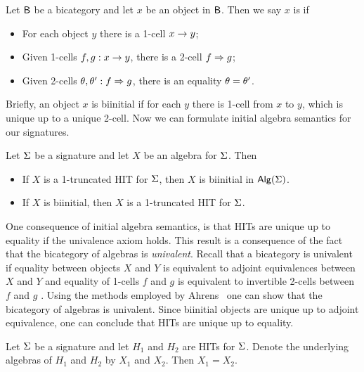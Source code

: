 \begin{definition}
Let $\mathsf{B}$ be a bicategory and let $x$ be an object in $\mathsf{B}$.
Then we say $x$ is  if
\begin{itemize}
	\item For each object $y$ there is a 1-cell $x \rightarrow y$;
	\item Given 1-cells $f, g : x \rightarrow y$, there is a 2-cell $f \Rightarrow g$;
	\item Given 2-cells $\theta, \theta' : f \Rightarrow g$, there is an equality $\theta = \theta'$.
\end{itemize}
\end{definition}

Briefly, an object $x$ is biinitial if for each $y$ there is 1-cell from $x$ to $y$, which is unique up to a unique 2-cell.
Now we can formulate initial algebra semantics for our signatures.

\begin{proposition}
\label{thm:initial_alg_sem}
Let $\Sigma$ be a signature and let $X$ be an algebra for $\Sigma$.
Then
\begin{itemize}
	\item If $X$ is a 1-truncated HIT for $\Sigma$, then $X$ is biinitial in $\mathsf{Alg}(\Sigma)$.
	\item If $X$ is biinitial, then $X$ is a 1-truncated HIT for $\Sigma$.
\end{itemize}
\end{proposition}

One consequence of initial algebra semantics, is that HITs are unique up to equality if the univalence axiom holds.
This result is a consequence of the fact that the bicategory of algebras is \emph{univalent}.
Recall that a bicategory is univalent if
equality between objects $X$ and $Y$ is equivalent to adjoint equivalences between $X$ and $Y$
and equality of 1-cells $f$ and $g$ is equivalent to invertible 2-cells between $f$ and $g$
\cite{bicatjournal}.
Using the methods employed by Ahrens \etal \ one can show that the bicategory of algebras
is univalent.
Since biinitial objects are unique up to adjoint equivalence, one can conclude that HITs are unique up
to equality.

\begin{proposition}
Let $\Sigma$ be a signature and let $H_1$ and $H_2$ are HITs for $\Sigma$.
Denote the underlying algebras of $H_1$ and $H_2$ by $X_1$ and $X_2$.
Then $X_1 = X_2$.
\end{proposition}
